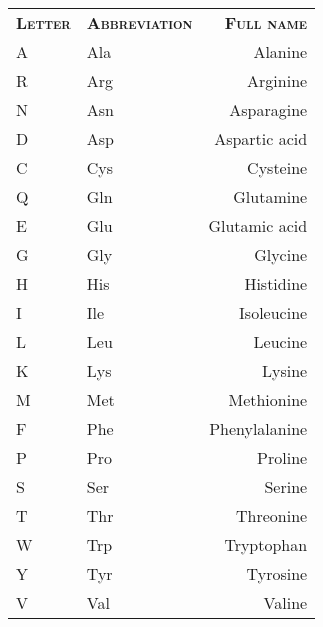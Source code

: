 \documentclass{article}
\begin{document}
\begin{center}

\noindent\begin{minipage}{\linewidth}%
\begin{center}%
\begin{tabular}{>{\scshape}llr}%
\rowcolor[gray]{0.9}
\color{black} \bfseries \scshape Letter & \bfseries \scshape Abbreviation & \bfseries \scshape Full name\\
A & Ala & Alanine\\
R & Arg & Arginine\\
N & Asn & Asparagine\\
D & Asp & Aspartic acid\\
C & Cys & Cysteine\\
Q & Gln & Glutamine\\
E & Glu & Glutamic acid\\
G & Gly & Glycine\\
H & His & Histidine\\
I & Ile & Isoleucine\\
L & Leu & Leucine\\
K & Lys & Lysine\\
M & Met & Methionine\\
F & Phe & Phenylalanine\\
P & Pro & Proline\\
S & Ser & Serine\\
T & Thr & Threonine\\
W & Trp & Tryptophan\\
Y & Tyr & Tyrosine\\
V & Val & Valine\\
\end{tabular}%
\end{center}%
\end{minipage}%

\end{center}%
\end{document}
